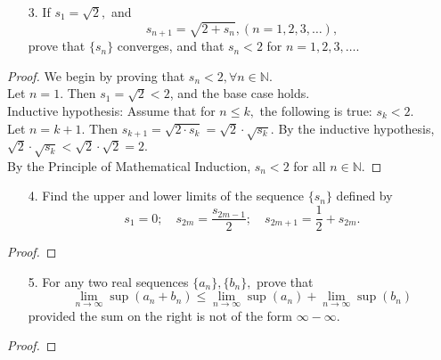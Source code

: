 \documentclass[10pt]{article}
\theoremstyle{definition}
\theoremstyle{plain}
\newcommand{\N}{\mathbb{N}}
\begin{document}
\pagebreak



\begin{enumerate}
\item[3.] If $s_1 = \sqrt{2},$ and
$$s_{n+1} =\sqrt{2+s_n}, (n=1,2,3,\dots),$$
prove that $\{s_n\}$ converges, and that $s_n<2$ for $n=1,2,3,\dots$.
\end{enumerate}

\begin{proof}
We begin by proving that $s_n<2, \forall n\in\N$. \\

Let $n=1.$ Then $s_1=\sqrt{2}<2$, and the base case holds. \\

Inductive hypothesis: Assume that for $n\leq k,$ the following is true: $s_k < 2$. \\

Let $n=k+1$. Then $s_{k+1} = \sqrt{2\cdot s_k} = \sqrt{2}\cdot\sqrt{s_k}.$ By the inductive hypothesis, $\sqrt{2}\cdot\sqrt{s_k}< \sqrt{2}\cdot\sqrt{2} = 2.$ \\

By the Principle of Mathematical Induction, $s_n<2$ for all $n\in\N$.
\end{proof}



\pagebreak



\begin{enumerate}
\item[4.] Find the upper and lower limits of the sequence $\{s_n\}$ defined by
$$s_1=0; \quad s_{2m}=\frac{s_{2m-1}}{2}; \quad s_{2m+1}=\frac{1}{2} + s_{2m}.$$
\end{enumerate}

\begin{proof}

\end{proof}



\pagebreak



\begin{enumerate}
\item[5.] For any two real sequences $\{a_n\}, \{b_n\},$ prove that
$$\lim_{n\rightarrow\infty} \sup(a_n+b_n)\leq \lim_{n\rightarrow\infty} \sup(a_n) + \lim_{n\rightarrow\infty} \sup(b_n)$$
provided the sum on the right is not of the form $\infty-\infty$.
\end{enumerate}

\begin{proof}

\end{proof}
\end{document}
